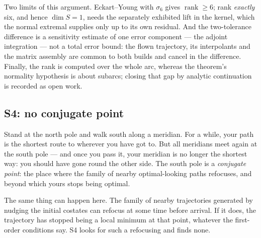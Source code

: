 \documentclass[11pt]{article}
\begin{document}
\begin{warn}
Two limits of this argument. Eckart--Young with $\sigma_6$ gives
$\operatorname{rank} \ge 6$; rank \emph{exactly} six, and hence $\dim S = 1$,
needs the separately exhibited lift in the kernel, which the normal extremal
supplies only up to its own residual. And the two-tolerance difference is a
sensitivity estimate of one error component --- the adjoint integration --- not
a total error bound: the flown trajectory, its interpolants and the matrix
assembly are common to both builds and cancel in the difference. Finally, the
rank is computed over the whole arc, whereas the theorem's normality hypothesis
is about subarcs; closing that gap by analytic continuation is recorded as open
work.
\end{warn}

\subsection{S4: no conjugate point}\label{sec:S4}

\begin{eli}
Stand at the north pole and walk south along a meridian. For a while, your path
is the shortest route to wherever you have got to. But all meridians meet again
at the south pole --- and once you pass it, your meridian is no longer the
shortest way: you should have gone round the other side. The south pole is a
\emph{conjugate point}: the place where the family of nearby optimal-looking
paths refocuses, and beyond which yours stops being optimal.

The same thing can happen here. The family of nearby trajectories generated by
nudging the initial costates can refocus at some time before arrival. If it
does, the trajectory has stopped being a local minimum at that point, whatever
the first-order conditions say. S4 looks for such a refocusing and finds none.
\end{eli}
\end{document}
